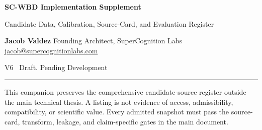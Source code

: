 \documentclass[9pt,a4paper]{article}
\begin{document}
\begin{center}
{\sffamily\bfseries\fontsize{19}{22}\selectfont\color{ink}
SC-WBD Implementation Supplement\par}
\vspace{2mm}
{\sffamily\fontsize{11}{13}\selectfont\color{muted}
Candidate Data, Calibration, Source-Card, and Evaluation Register\par}
\vspace{3mm}
{\sffamily\bfseries Jacob Valdez}\quad\textperiodcentered\quad
{\sffamily Founding Architect, SuperCognition Labs}\quad\textperiodcentered\quad
{\sffamily\href{mailto:jacob@supercognitionlabs.com}{jacob@supercognitionlabs.com}}\par
\vspace{2mm}
{\sffamily\small\color{frontpurple}V6 \textperiodcentered\ Draft. Pending Development}
\end{center}
\vspace{2mm}\hrule\vspace{3mm}
\noindent This companion preserves the comprehensive candidate-source register
outside the main technical thesis. A listing is not evidence of access,
admissibility, compatibility, or scientific value. Every admitted snapshot
must pass the source-card, transform, leakage, and claim-specific gates in the
main document.



\end{document}
